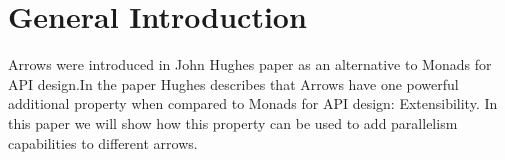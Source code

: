 \section{General Introduction}
Arrows were introduced in John Hughes paper as an alternative to Monads for API design.\citHughes In the paper Hughes describes that Arrows have one powerful additional property when compared to Monads for API design: Extensibility. In this paper we will show how this property can be used to add parallelism capabilities to different arrows.